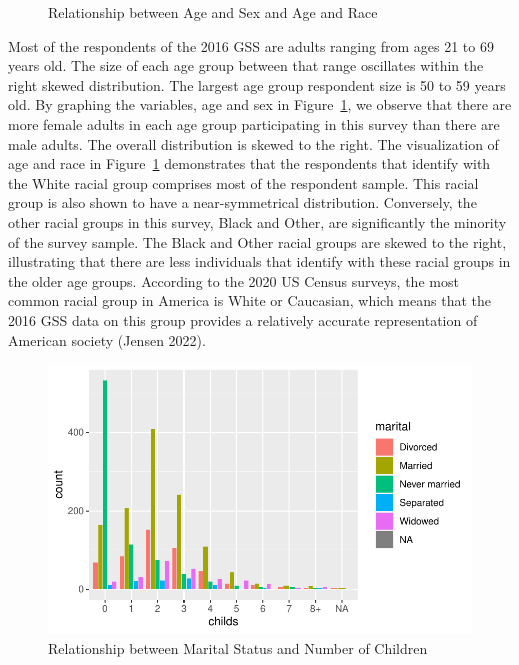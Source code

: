 \documentclass[
]{article}
\begin{document}
\begin{figure}
\begin{minipage}[t]{0.50\linewidth}
{{}

}

\end{minipage}%

\caption{\label{fig-agesidebyside}Relationship between Age and Sex and
Age and Race}

\end{figure}

Most of the respondents of the 2016 GSS are adults ranging from ages 21
to 69 years old. The size of each age group between that range
oscillates within the right skewed distribution. The largest age group
respondent size is 50 to 59 years old. By graphing the variables, age
and sex in Figure~\ref{fig-agesidebyside}, we observe that there are
more female adults in each age group participating in this survey than
there are male adults. The overall distribution is skewed to the right.
The visualization of age and race in Figure~\ref{fig-agesidebyside}
demonstrates that the respondents that identify with the White racial
group comprises most of the respondent sample. This racial group is also
shown to have a near-symmetrical distribution. Conversely, the other
racial groups in this survey, Black and Other, are significantly the
minority of the survey sample. The Black and Other racial groups are
skewed to the right, illustrating that there are less individuals that
identify with these racial groups in the older age groups. According to
the 2020 US Census surveys, the most common racial group in America is
White or Caucasian, which means that the 2016 GSS data on this group
provides a relatively accurate representation of American society
(Jensen 2022).

\begin{figure}

{\centering \includegraphics{paper_files/figure-pdf/fig-childsandmarital-1.pdf}

}

\caption{\label{fig-childsandmarital}Relationship between Marital Status
and Number of Children}

\end{figure}
\end{document}
